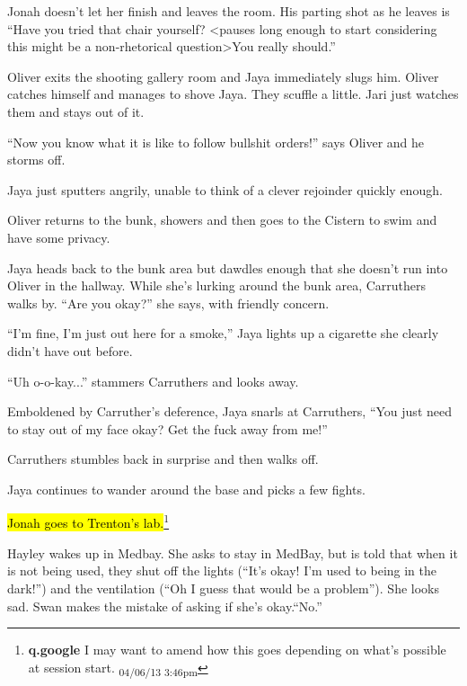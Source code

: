 Jonah doesn't let her finish and leaves the room.  His parting shot as he leaves is ``Have you tried that chair yourself? \textless pauses long enough to start considering this might be a non-rhetorical question\textgreater  You really should.''



Oliver exits the shooting gallery room and Jaya immediately slugs him.  Oliver catches himself and manages to shove Jaya.  They scuffle a little.  Jari just watches them and stays out of it. 

``Now you know what it is like to follow bullshit orders!'' says Oliver and he storms off.

Jaya just sputters angrily, unable to think of a clever rejoinder quickly enough.



Oliver returns to the bunk, showers and then goes to the Cistern to swim and have some privacy.



Jaya heads back to the bunk area but dawdles enough that she doesn't run into Oliver in the hallway.  While she's lurking around the bunk area, Carruthers walks by.  ``Are you okay?'' she says, with friendly concern.

``I'm fine, I'm just out here for a smoke,'' Jaya lights up a cigarette she clearly didn't have out before.

``Uh o-o-kay...'' stammers Carruthers and looks away.

Emboldened by Carruther's deference, Jaya snarls at Carruthers, ``You just need to stay out of my face okay?  Get the fuck away from me!''

Carruthers stumbles back in surprise and then walks off.

Jaya continues to wander around the base and picks a few fights.



\hl{Jonah goes to Trenton's lab.}\footnote{\textbf{q.google }I may want to amend how this goes depending on what's possible at session start. \textsubscript{04/06/13 3:46pm}}  



Hayley wakes up in Medbay.  She asks to stay in MedBay, but is told that when it is not being used, they shut off the lights (``It's okay!  I'm used to being in the dark!'') and the ventilation (``Oh I guess that would be a problem'').  She looks sad.  Swan makes the mistake of asking if she's okay.``No.''

